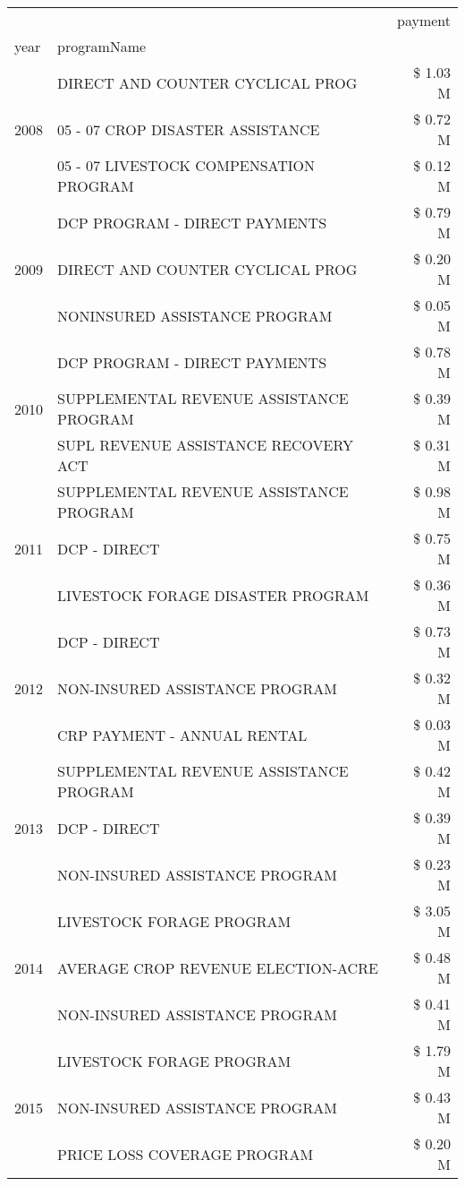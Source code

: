 \begin{tabular}{llr}
\toprule
 &  & payment \\
year & programName &  \\
\midrule
\multirow[t]{3}{*}{2008} & DIRECT AND COUNTER CYCLICAL PROG & \$ 1.03 M \\
 & 05 - 07 CROP DISASTER ASSISTANCE & \$ 0.72 M \\
 & 05 - 07 LIVESTOCK COMPENSATION PROGRAM & \$ 0.12 M \\
\cline{1-3}
\multirow[t]{3}{*}{2009} & DCP PROGRAM - DIRECT PAYMENTS & \$ 0.79 M \\
 & DIRECT AND COUNTER CYCLICAL PROG & \$ 0.20 M \\
 & NONINSURED ASSISTANCE PROGRAM & \$ 0.05 M \\
\cline{1-3}
\multirow[t]{3}{*}{2010} & DCP PROGRAM - DIRECT PAYMENTS & \$ 0.78 M \\
 & SUPPLEMENTAL REVENUE ASSISTANCE PROGRAM & \$ 0.39 M \\
 & SUPL REVENUE ASSISTANCE RECOVERY ACT & \$ 0.31 M \\
\cline{1-3}
\multirow[t]{3}{*}{2011} & SUPPLEMENTAL REVENUE ASSISTANCE PROGRAM & \$ 0.98 M \\
 & DCP - DIRECT & \$ 0.75 M \\
 & LIVESTOCK FORAGE DISASTER PROGRAM & \$ 0.36 M \\
\cline{1-3}
\multirow[t]{3}{*}{2012} & DCP - DIRECT & \$ 0.73 M \\
 & NON-INSURED ASSISTANCE PROGRAM & \$ 0.32 M \\
 & CRP PAYMENT - ANNUAL RENTAL & \$ 0.03 M \\
\cline{1-3}
\multirow[t]{3}{*}{2013} & SUPPLEMENTAL REVENUE ASSISTANCE PROGRAM & \$ 0.42 M \\
 & DCP - DIRECT & \$ 0.39 M \\
 & NON-INSURED ASSISTANCE PROGRAM & \$ 0.23 M \\
\cline{1-3}
\multirow[t]{3}{*}{2014} & LIVESTOCK FORAGE PROGRAM & \$ 3.05 M \\
 & AVERAGE CROP REVENUE ELECTION-ACRE & \$ 0.48 M \\
 & NON-INSURED ASSISTANCE PROGRAM & \$ 0.41 M \\
\cline{1-3}
\multirow[t]{3}{*}{2015} & LIVESTOCK FORAGE PROGRAM & \$ 1.79 M \\
 & NON-INSURED ASSISTANCE PROGRAM & \$ 0.43 M \\
 & PRICE LOSS COVERAGE PROGRAM & \$ 0.20 M \\
\cline{1-3}

\end{tabular}
